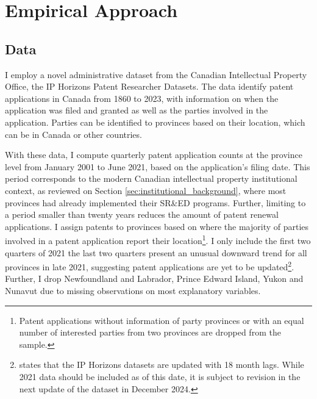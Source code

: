 \documentclass[../main.tex]{subfiles}
\begin{document}
\section{Empirical Approach}
\label{sec:empirical_strategy}

\subsection{Data}

I employ a novel administrative dataset from the Canadian Intellectual Property Office, the IP Horizons Patent Researcher Datasets\nocite{canadianintellectualpropertyoffice23}. The data identify patent applications in Canada from 1860 to 2023, with information on when the application was filed and granted as well as the parties involved in the application. Parties can be identified to provinces based on their location, which can be in Canada or other countries. 


With these data, I compute quarterly patent application counts at the province level from January 2001 to June 2021, based on the application's filing date. This period corresponds to the modern Canadian intellectual property institutional context, as reviewed on Section \ref{sec:institutional_background}, where most provinces had already implemented their SR\&ED programs. Further, limiting to a period smaller than twenty years reduces the amount of patent renewal applications. I assign patents to provinces based on where the majority of parties involved in a patent application report their location\footnote{Patent applications without information of party provinces or with an equal number of interested parties from two provinces are dropped from the sample.}. I only include the first two quarters of 2021 the last two quarters present an unusual downward trend for all provinces in late 2021, suggesting patent applications are yet to be updated\footnote{\textcite{canadianintellectualpropertyoffice23} states that the IP Horizons datasets are updated with 18 month lags. While 2021 data should be included as of this date, it is subject to revision in the next update of the dataset in December 2024.}. Further, I drop Newfoundland and Labrador, Prince Edward Island, Yukon and Nunavut due to missing observations on most explanatory variables. 

\end{document}
